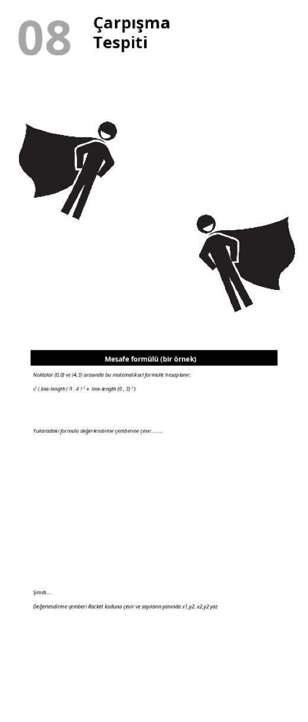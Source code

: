 \documentclass[12pt, a4paper]{article}
\begin{document}
\newpage
\includegraphics[width=1\linewidth]{cebir-bolum-08-000.png}
\newpage
\includegraphics[width=1\linewidth]{cebirsplit-40.png}
\end{document}
